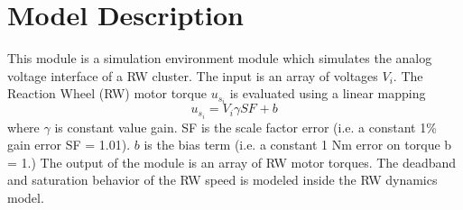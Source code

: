 \section{Model Description}
This module is a simulation environment module which simulates the analog voltage interface of a RW cluster.  The input is an array of voltages $V_{i}$.  The Reaction Wheel (RW) motor torque $u_{s_{i}}$ is evaluated using a linear mapping
\begin{equation}
u_{s_{i}} = V_{i} \gamma SF_{} + b_{}
\end{equation}
where $\gamma$ is constant value gain. SF is the scale factor error (i.e. a constant 1\% gain error SF = 1.01). $b$ is the bias term (i.e. a constant 1 Nm error on torque b = 1.)  The output of the module is an array of RW motor torques.  The deadband and saturation behavior of the RW speed is modeled inside the RW dynamics model.  